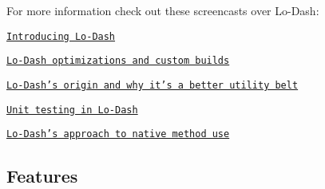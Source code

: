 For more information check out these screencasts over Lo-\/\+Dash\+:


\begin{DoxyItemize}
\item \href{https://vimeo.com/44154599}{\tt Introducing Lo-\/\+Dash}
\item \href{https://vimeo.com/44154601}{\tt Lo-\/\+Dash optimizations and custom builds}
\item \href{https://vimeo.com/44154600}{\tt Lo-\/\+Dash’s origin and why it’s a better utility belt}
\item \href{https://vimeo.com/45865290}{\tt Unit testing in Lo-\/\+Dash}
\item \href{https://vimeo.com/48576012}{\tt Lo-\/\+Dash’s approach to native method use}
\end{DoxyItemize}

\subsection*{Features}


